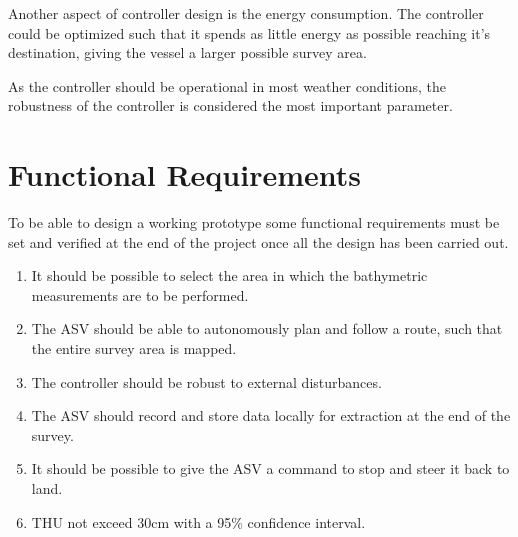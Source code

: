 Another aspect of controller design is the energy consumption. 
The controller could be optimized such that it spends as little energy as possible reaching it's destination, giving the vessel a larger possible survey area. 

As the controller should be operational in most weather conditions, the robustness of the controller is considered the most important parameter. 



\section{Functional Requirements} \label{sec:requirements}
To be able to design a working prototype some functional requirements must be set and verified at the end of the project once all the design has been carried out.
%
\begin{enumerate}
  \item It should be possible to select the area in which the bathymetric measurements are to be performed.
  \item The ASV should be able to autonomously plan and follow a route, such that the entire survey area is mapped.
  \item The controller should be robust to external disturbances.
  \item The ASV should record and store data locally for extraction at the end of the survey.
  \item It should be possible to give the ASV a command to stop and steer it back to land.
  \item THU not exceed 30cm with a 95\% confidence interval.
\end{enumerate}
%






